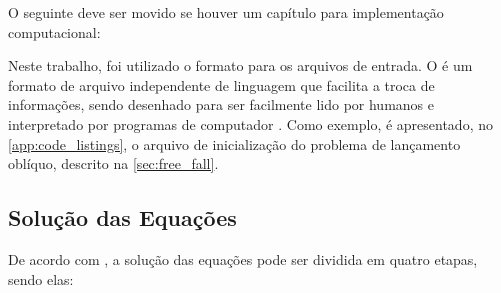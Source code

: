 \alert{O seguinte deve ser movido se houver um capítulo para implementação computacional:}

Neste trabalho, foi utilizado o formato \JSON{} para os arquivos de entrada. O \JSON{} é um formato de arquivo independente de linguagem que facilita a troca de informações, sendo desenhado para ser facilmente lido por humanos e interpretado por programas de computador \cite{bib:json}. Como exemplo, é apresentado, no \cref{app:code_listings}, o arquivo de inicialização do problema de lançamento oblíquo, descrito na \cref{sec:free_fall}.

\subsection{Solução das Equações} \label{subsec:simulation:equation_solution}

De acordo com , a solução das equações pode ser dividida em quatro etapas, sendo elas:

